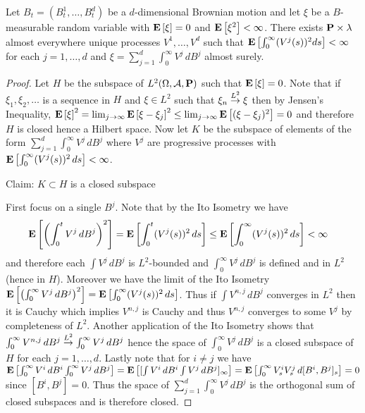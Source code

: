 \begin{lem}\label{RepresentationOfBrownianFunctionals}Let $B_t=(B^1_t, \dotsc, B^d_t)$ be a $d$-dimensional Brownian motion and let $\xi$ be a $B$-measurable random variable with $\textbf{E}\left[\xi\right] = 0$ and $\textbf{E}\left[\xi^2\right] < \infty$.  There exists $\textbf{P} \times \lambda$ almost everywhere unique processes $V^1, \dotsc, V^d$ such that $\textbf{E}\left[\int_0^\infty (V^j(s))^2 ds\right] < \infty$ for each $j=1, \dotsc, d$ and $\xi = \sum_{j=1}^d \int_0^\infty V^j \, dB^j$ almost surely.
\end{lem}
\begin{proof}
Let $H$ be the subspace of $L^2(\Omega, \mathcal{A}, \textbf{P})$ such that $\textbf{E}\left[\xi\right] = 0$.  Note that if $\xi_1, \xi_2, \dots$ is a sequence in $H$ and $\xi \in L^2$ such that $\xi_n \overset{L^2}\to \xi$ then by Jensen's Inequality, $\textbf{E}\left[\xi\right]^2 = \lim_{j \to \infty} \textbf{E}\left[\xi - \xi_j\right]^2 \leq \lim_{j \to \infty} \textbf{E}\left[(\xi - \xi_j)^2\right]  = 0$ and therefore $H$ is closed hence a Hilbert space.  Now let $K$ be the subspace of elements of the form $\sum_{j=1}^d \int_0^\infty V^j \, dB^j$ where $V^j$ are progressive processes with $\textbf{E}\left[\int_0^\infty (V^j(s))^2 \, ds \right] < \infty$.  

Claim: $K \subset H$ is a closed subspace

First focus on a single $B^j$.  Note that by the Ito Isometry we have
\begin{align*}
\textbf{E}\left[\left(\int_0^t V^j \, dB^j\right)^2\right] &= \textbf{E}\left[\int_0^t (V^j(s))^2 \, ds \right] \leq \textbf{E}\left[\int_0^\infty (V^j(s))^2 \, ds \right] < \infty
\end{align*}
and therefore each $\int V^j \, dB^j$ is $L^2$-bounded and $\int_0^\infty V^j \, dB^j$ is defined and in $L^2$ (hence in $H$).  Moreover we have the limit of the Ito Isometry $\textbf{E}\left[\left(\int_0^\infty V^j \, dB^j\right)^2\right] = \textbf{E}\left[\int_0^\infty (V^j(s))^2 \, ds\right]$.  Thus if $\int V^{n,j} \, dB^j$ converges in $L^2$ then it is Cauchy which implies $V^{n,j}$ is Cauchy and thus $V^{n,j}$ converges to some $V^{j}$ by completeness of $L^2$.  Another application of the Ito Isometry shows that $\int_0^\infty V^{n,j} \, dB^j \overset{L^2}\to \int_0^\infty V^j \, dB^j$ hence the space of $\int_0^\infty V^j \, dB^j$ is a closed subspace of $H$ for each $j=1, \dotsc, d$.  Lastly note that for $i \neq j$ we have $\textbf{E}\left[\int_0^\infty V^i \, dB^i \int_0^\infty V^j \, dB^j\right] = \textbf{E}\left[[\int V^i \, dB^i \int V^j \, dB^j]_\infty\right] = \textbf{E}\left[\int_0^\infty V_s^i V_s^j \, d[B^i,B^j]_s\right] = 0$ since $[B^i,B^j] = 0$.  Thus the space of $\sum_{j=1}^d \int_0^\infty V^j \, dB^j$ is the orthogonal sum of closed subspaces and is therefore closed.


\end{proof}
